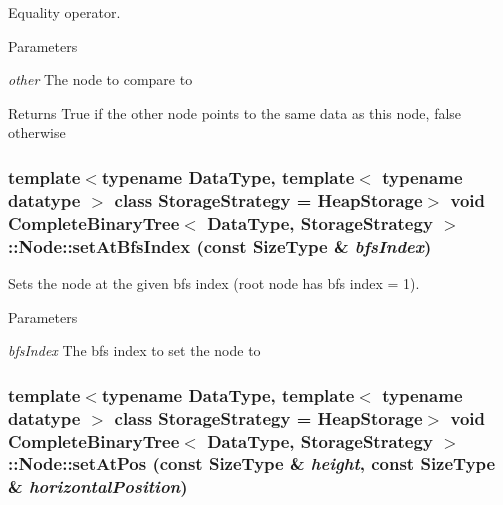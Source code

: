 Equality operator. 


\begin{DoxyParams}{Parameters}
\item[{\em other}]The node to compare to \end{DoxyParams}
\begin{DoxyReturn}{Returns}
True if the other node points to the same data as this node, false otherwise 
\end{DoxyReturn}
\hypertarget{class_complete_binary_tree_1_1_node_a12eb13f341c8bab833c25b7f745c9ecf}{
\subsubsection[{setAtBfsIndex}]{\setlength{\rightskip}{0pt plus 5cm}template$<$typename DataType, template$<$ typename datatype $>$ class StorageStrategy = HeapStorage$>$ void {\bf CompleteBinaryTree}$<$ DataType, StorageStrategy $>$::Node::setAtBfsIndex (const SizeType \& {\em bfsIndex})}}
\label{class_complete_binary_tree_1_1_node_a12eb13f341c8bab833c25b7f745c9ecf}


Sets the node at the given bfs index (root node has bfs index = 1). 


\begin{DoxyParams}{Parameters}
\item[{\em bfsIndex}]The bfs index to set the node to \end{DoxyParams}
\hypertarget{class_complete_binary_tree_1_1_node_a81f250b9aaed4e456f5265f2f83ef769}{
\subsubsection[{setAtPos}]{\setlength{\rightskip}{0pt plus 5cm}template$<$typename DataType, template$<$ typename datatype $>$ class StorageStrategy = HeapStorage$>$ void {\bf CompleteBinaryTree}$<$ DataType, StorageStrategy $>$::Node::setAtPos (const SizeType \& {\em height}, \/  const SizeType \& {\em horizontalPosition})}}
\label{class_complete_binary_tree_1_1_node_a81f250b9aaed4e456f5265f2f83ef769}


